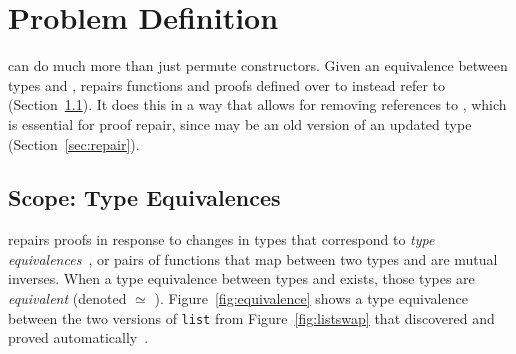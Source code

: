 \section{Problem Definition}
\label{sec:key1}

\toolname can do much more than just permute constructors. %
Given an equivalence between types \A and \B,
\toolname repairs functions and proofs defined over \A to instead refer to \B (Section~\ref{sec:scope}).
It does this in a way that allows for removing references to \A, which is essential for proof repair,
since \A may be an old version of an updated type (Section~\ref{sec:repair}).



\subsection{Scope: Type Equivalences}
\label{sec:scope}

\toolname repairs proofs in response to changes in types that correspond to \textit{type equivalences}~\cite{univalent2013homotopy},
or pairs of functions that map between two types and are mutual inverses.
When a type equivalence between types \A and \B exists, those types are \textit{equivalent} (denoted \A $\simeq$ \B). %
Figure~\ref{fig:equivalence} shows a type equivalence between the two versions of \lstinline{list}
from Figure~\ref{fig:listswap} that \toolname discovered and proved automatically~.

